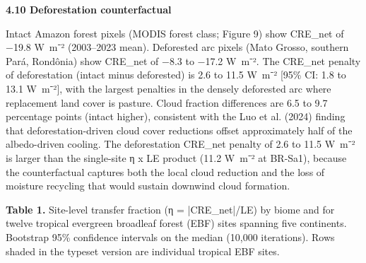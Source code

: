 \textbf{4.10 Deforestation counterfactual}

Intact Amazon forest pixels (MODIS forest class; Figure 9) show CRE\_net
of −19.8 W~m⁻² (2003--2023 mean). Deforested arc pixels (Mato Grosso,
southern Pará, Rondônia) show CRE\_net of −8.3 to −17.2 W~m⁻². The
CRE\_net penalty of deforestation (intact minus deforested) is 2.6 to
11.5 W~m⁻² {[}95\% CI: 1.8 to 13.1 W~m⁻²{]}, with the largest penalties
in the densely deforested arc where replacement land cover is pasture.
Cloud fraction differences are 6.5 to 9.7 percentage points (intact
higher), consistent with the Luo et al. (2024) finding that
deforestation-driven cloud cover reductions offset approximately half of
the albedo-driven cooling. The deforestation CRE\_net penalty of 2.6 to
11.5 W~m⁻² is larger than the single-site η x LE product (11.2 W~m⁻² at
BR-Sa1), because the counterfactual captures both the local cloud
reduction and the loss of moisture recycling that would sustain downwind
cloud formation.


\textbf{Table 1.} Site-level transfer fraction (η = |CRE\_net|/LE) by biome and for twelve tropical evergreen broadleaf forest (EBF) sites spanning five continents. Bootstrap 95\% confidence intervals on the median (10,000 iterations). Rows shaded in the typeset version are individual tropical EBF sites.

